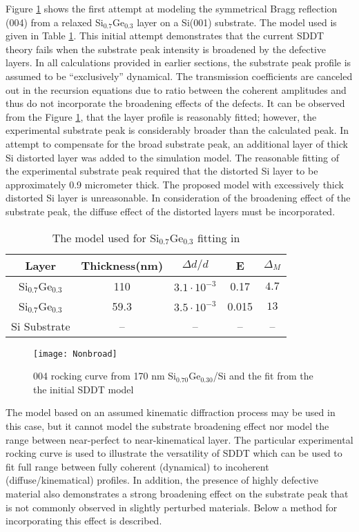 Figure \ref{fig:GeSi1} shows the first attempt at modeling the symmetrical Bragg reflection (004) from a relaxed Si$_{0.7}$Ge$_{0.3}$ layer on a Si(001) substrate. The model used is given in Table \ref{model1}.  This initial attempt demonstrates that the current SDDT theory fails when the substrate peak intensity is broadened by the defective layers.  In all calculations provided in earlier sections, the substrate peak profile is assumed to be ``exclusively'' dynamical.  The transmission coefficients are canceled out in  the recursion equations due to ratio between the coherent amplitudes and thus do not incorporate the broadening effects of the defects.  It can be observed from the Figure \ref{fig:GeSi1}, that the layer profile is reasonably fitted; however, the experimental substrate peak is considerably broader than the calculated peak.  In attempt to compensate for the broad substrate peak, an additional layer of thick Si distorted layer was added to the simulation model.  The reasonable fitting of the experimental substrate peak required that the distorted Si layer to be approximately 0.9 micrometer thick.  The proposed model with excessively thick distorted Si layer is unreasonable.  In consideration of the broadening effect of the substrate peak, the diffuse effect of the distorted layers must be incorporated.
%
\begin{table}[h]
\centering
\caption{The model used for Si$_{0.7}$Ge$_{0.3}$ fitting in }
\label{model1}
\begin{tabular}{c|cccc}
\hline
Layer & Thickness(nm) & $\Delta d/d$ & E & $\Delta_M$\\
\hline
Si$_{0.7}$Ge$_{0.3}$ & 110 & $3.1 \cdot 10^{-3}$ & 0.17 & $4.7 $\\
Si$_{0.7}$Ge$_{0.3}$ & 59.3& $3.5 \cdot 10^{-3}$ & 0.015 & $13 $\\
Si Substrate & -- & -- & -- & --\\
\hline
\end{tabular}
\end{table}
%
\begin{figure}
	\texttt{[image: Nonbroad]}
	\caption{004 rocking curve from 170 nm Si$_{0.70}$Ge$_{0.30}$/Si and the fit from the the initial SDDT model}
	\label{fig:GeSi1}
	\end{figure}
%
The model based on an assumed kinematic diffraction process may be used in this case, but it cannot model the substrate broadening effect nor model the range between near-perfect to near-kinematical layer.  The particular experimental rocking curve is used to illustrate the versatility of SDDT which can be used to fit full range between fully coherent (dynamical) to incoherent (diffuse/kinematical) profiles.  In addition, the presence of highly defective material also demonstrates a strong broadening effect on the substrate peak that is not commonly observed in slightly perturbed materials. Below a method for incorporating this effect is described.

